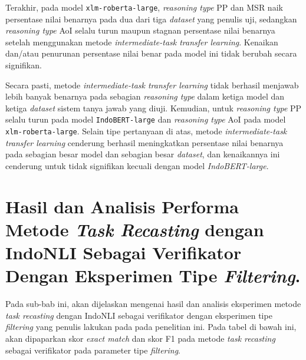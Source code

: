 Terakhir, pada model \texttt{xlm-roberta-large}, \emph{reasoning type} PP dan MSR naik persentase nilai benarnya pada dua dari tiga \emph{dataset} yang penulis uji, sedangkan \emph{reasoning type} AoI selalu turun maupun stagnan persentase nilai benarnya setelah menggunakan metode \emph{intermediate-task transfer learning}. Kenaikan dan/atau penurunan persentase nilai benar pada model ini tidak berubah secara signifikan.

Secara pasti, metode \emph{intermediate-task transfer learning} tidak berhasil menjawab lebih banyak benarnya pada sebagian \emph{reasoning type} dalam ketiga model dan ketiga \emph{dataset} sistem tanya jawab yang diuji. Kemudian, untuk \emph{reasoning type} PP selalu turun pada model \texttt{IndoBERT-large} dan \emph{reasoning type} AoI pada model \texttt{xlm-roberta-large}. Selain tipe pertanyaan di atas, metode \emph{intermediate-task transfer learning} cenderung berhasil meningkatkan persentase nilai benarnya pada sebagian besar model dan sebagian besar \emph{dataset}, dan kenaikannya ini cenderung untuk tidak signifikan kecuali dengan model \emph{IndoBERT-large}. 

\section{Hasil dan Analisis Performa Metode \emph{Task Recasting} dengan IndoNLI Sebagai Verifikator Dengan Eksperimen Tipe \emph{Filtering}.}
\label{5.4}
Pada sub-bab ini, akan dijelaskan mengenai hasil dan analisis eksperimen metode \emph{task recasting} dengan IndoNLI sebagai verifikator dengan eksperimen tipe \emph{filtering} yang penulis lakukan pada pada penelitian ini. Pada tabel di bawah ini, akan dipaparkan skor \emph{exact match} dan skor F1 pada metode \emph{task recasting} sebagai verifikator pada parameter tipe \emph{filtering}.

